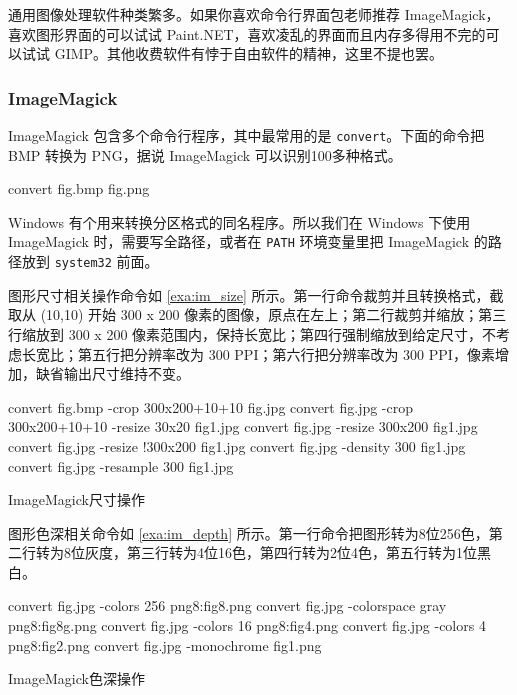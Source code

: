 通用图像处理软件种类繁多。如果你喜欢命令行界面包老师推荐 ImageMagick，喜欢图形界面的可以试试 Paint.NET，喜欢凌乱的界面而且内存多得用不完的可以试试 GIMP。其他收费软件有悖于自由软件的精神，这里不提也罢。

\subsubsection{ImageMagick}

ImageMagick 包含多个命令行程序，其中最常用的是 \texttt{convert}。下面的命令把 BMP 转换为 PNG，据说 ImageMagick 可以识别100多种格式。

\begin{Code}[]
convert fig.bmp fig.png 
\end{Code}

Windows 有个用来转换分区格式的同名程序。所以我们在 Windows 下使用 ImageMagick 时，需要写全路径，或者在 \texttt{PATH} 环境变量里把 ImageMagick 的路径放到 \texttt{system32} 前面。

图形尺寸相关操作命令如 \autoref{exa:im_size} 所示。第一行命令裁剪并且转换格式，截取从 (10,10) 开始 300 x 200 像素的图像，原点在左上；第二行裁剪并缩放；第三行缩放到 300 x 200 像素范围内，保持长宽比；第四行强制缩放到给定尺寸，不考虑长宽比；第五行把分辨率改为 300 PPI；第六行把分辨率改为 300 PPI，像素增加，缺省输出尺寸维持不变。

\begin{example}[h]
\begin{Code}[numbers=left]
convert fig.bmp -crop 300x200+10+10 fig.jpg
convert fig.jpg -crop 300x200+10+10 -resize 30x20 fig1.jpg
convert fig.jpg -resize 300x200 fig1.jpg
convert fig.jpg -resize !300x200 fig1.jpg
convert fig.jpg -density 300 fig1.jpg
convert fig.jpg -resample 300 fig1.jpg
\end{Code}
\caption{ImageMagick尺寸操作}
\label{exa:im_size}
\end{example}

图形色深相关命令如 \autoref{exa:im_depth} 所示。第一行命令把图形转为8位256色，第二行转为8位灰度，第三行转为4位16色，第四行转为2位4色，第五行转为1位黑白。

\begin{example}[h]
\begin{Code}[numbers=left]
convert fig.jpg -colors 256 png8:fig8.png
convert fig.jpg -colorspace gray png8:fig8g.png
convert fig.jpg -colors 16 png8:fig4.png
convert fig.jpg -colors 4 png8:fig2.png
convert fig.jpg -monochrome fig1.png
\end{Code}
\caption{ImageMagick色深操作}
\label{exa:im_depth}
\end{example}

